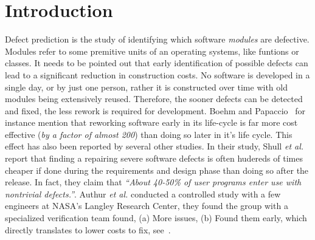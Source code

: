 \documentclass[12pt]{IEEEtran}
\begin{document}
\section{Introduction} \label{intro}
Defect prediction is the study of identifying which software \textit{modules} are defective. Modules refer to some premitive units of an operating systems, like funtions or classes. It needs to be pointed out that early identification of possible defects can lead to a significant reduction in construction costs. No software is developed in a single day, or by just one person, rather it is constructed over time with old modules being extensively reused. Therefore, the sooner defects can be detected and fixed, the less rework is required for development. Boehm and Papaccio~\cite{boehm88} for instance mention that reworking software early in its life-cycle is far more cost effective (\textit{by a factor of almost 200}) than doing so later in it's life cycle. This effect has also been reported by several other studies. In their study, Shull \textit{et al.}~\cite{shull2002we} report that finding a repairing severe software defects is often hudereds of times cheaper if done during the requirements and design phase than doing so after the release. In fact, they claim that \textit{``About 40-50\% of user programs enter use with
  nontrivial defects.''}. Authur \textit{et al.} \cite{arthur99} conducted a controlled study with a few engineers at NASA's Langley Research Center, they found the group with a specialized verification team found, (a) More issues, (b) Found them early, which directly translates to lower costs to fix, see~\cite{dabney2006predicting}. 
\end{document}
